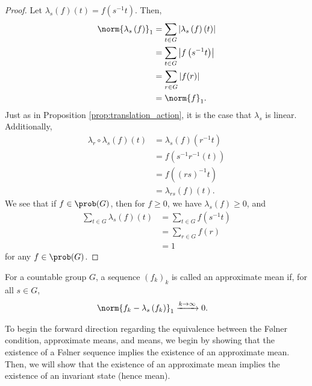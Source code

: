 \begin{proof}
  Let $\lambda_s\left(f\right)\left(t\right) = f\left(s^{-1}t\right)$. Then,
  \begin{align*}
    \norm{\lambda_s\left(f\right)}_1 &= \sum_{t\in G}\left\vert \lambda_s\left(f\right)\left(t\right) \right\vert\\
                                     &= \sum_{t\in G}\left\vert f\left(s^{-1}t\right) \right\vert\\
                                     &= \sum_{r\in G}\left\vert f(r) \right\vert\\
                                     &= \norm{f}_{1}.
  \end{align*}
  Just as in Proposition \ref{prop:translation_action}, it is the case that $\lambda_s$ is linear. Additionally,
  \begin{align*}
    \lambda_r\circ \lambda_s\left(f\right)\left(t\right) &= \lambda_s\left(f\right)\left(r^{-1}t\right)\\
                                                         &= f\left(s^{-1}r^{-1}\left(t\right)\right)\\
                                                         &= f\left(\left(rs\right)^{-1}t\right)\\
                                                         &= \lambda_{rs}\left(f\right)\left(t\right).
  \end{align*}
  We see that if $f\in \prob(G)$, then for $f\geq 0$, we have $\lambda_s\left(f\right) \geq 0$, and
  \begin{align*}
    \sum_{t\in G}\lambda_s\left(f\right)\left(t\right) &= \sum_{t\in G}f\left(s^{-1}t\right)\\
                                                       &= \sum_{r\in G}f\left(r\right)\\
                                                       &= 1
  \end{align*}
  for any $f\in \prob(G)$.
\end{proof}
\begin{definition}\label{def:approximate_mean}
  For a countable group $G$, a sequence $\left(f_k\right)_k$ is called an approximate mean if, for all $s\in G$,
  \begin{align*}
    \norm{f_k - \lambda_s\left(f_k\right)}_{1} &\xrightarrow{k\rightarrow \infty}0.
  \end{align*}
\end{definition}
To begin the forward direction regarding the equivalence between the Følner condition, approximate means, and means, we begin by showing that the existence of a Følner sequence implies the existence of an approximate mean. Then, we will show that the existence of an approximate mean implies the existence of an invariant state (hence mean).

